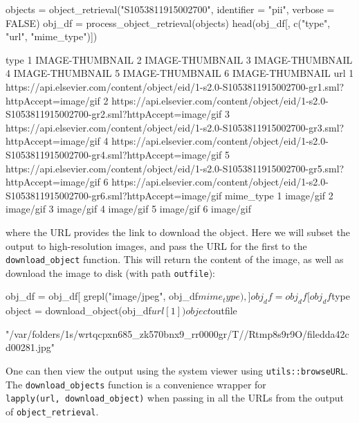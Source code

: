 \begin{Schunk}
\begin{Sinput}
objects = object_retrieval("S1053811915002700", identifier = "pii", verbose = FALSE)
obj_df = process_object_retrieval(objects)
head(obj_df[, c("type", "url", "mime_type")])
\end{Sinput}
\begin{Soutput}
             type
1 IMAGE-THUMBNAIL
2 IMAGE-THUMBNAIL
3 IMAGE-THUMBNAIL
4 IMAGE-THUMBNAIL
5 IMAGE-THUMBNAIL
6 IMAGE-THUMBNAIL
                                                                                                url
1 https://api.elsevier.com/content/object/eid/1-s2.0-S1053811915002700-gr1.sml?httpAccept=image/gif
2 https://api.elsevier.com/content/object/eid/1-s2.0-S1053811915002700-gr2.sml?httpAccept=image/gif
3 https://api.elsevier.com/content/object/eid/1-s2.0-S1053811915002700-gr3.sml?httpAccept=image/gif
4 https://api.elsevier.com/content/object/eid/1-s2.0-S1053811915002700-gr4.sml?httpAccept=image/gif
5 https://api.elsevier.com/content/object/eid/1-s2.0-S1053811915002700-gr5.sml?httpAccept=image/gif
6 https://api.elsevier.com/content/object/eid/1-s2.0-S1053811915002700-gr6.sml?httpAccept=image/gif
  mime_type
1 image/gif
2 image/gif
3 image/gif
4 image/gif
5 image/gif
6 image/gif
\end{Soutput}
\end{Schunk}

where the URL provides the link to download the object. Here we will
subset the output to high-resolution images, and pass the URL for the
first to the \texttt{download\_object} function. This will return the
content of the image, as well as download the image to disk (with path
\texttt{outfile}):

\begin{Schunk}
\begin{Sinput}
obj_df = obj_df[ grepl("image/jpeg", obj_df$mime_type),]
obj_df = obj_df[ obj_df$type %
object = download_object(obj_df$url[1])
object$outfile
\end{Sinput}
\begin{Soutput}
[1] "/var/folders/1s/wrtqcpxn685_zk570bnx9_rr0000gr/T//Rtmp8s9r9O/filedda42cd00281.jpg"
\end{Soutput}
\end{Schunk}

One can then view the output using the system viewer using
\texttt{utils::browseURL}. The \texttt{download\_objects} function is a
convenience wrapper for \texttt{lapply(url,\ download\_object)} when
passing in all the URLs from the output of \texttt{object\_retrieval}.

